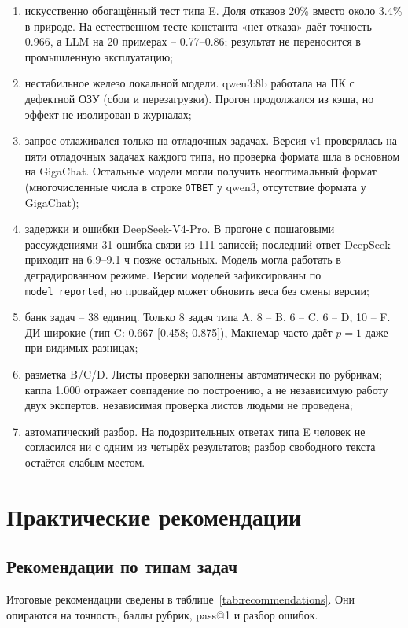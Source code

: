 \documentclass{bmstu}
\begin{document}
\begin{enumerate}[label=\arabic*), leftmargin=1.425\parindent, itemsep=0pt, topsep=-\parskip, wide=1.2cm]
\item искусственно обогащённый тест типа E. Доля отказов 20\% вместо около 3.4\% в природе. На естественном тесте константа «нет отказа» даёт точность 0.966, а LLM на 20 примерах -- 0.77--0.86; результат не переносится в промышленную эксплуатацию;
\item нестабильное железо локальной модели. qwen3:8b работала на ПК с дефектной ОЗУ (сбои и перезагрузки). Прогон продолжался из кэша, но эффект не изолирован в журналах;
\item запрос отлаживался только на отладочных задачах. Версия v1 проверялась на пяти отладочных задачах каждого типа, но проверка формата шла в основном на GigaChat. Остальные модели могли получить неоптимальный формат (многочисленные числа в строке \texttt{ОТВЕТ} у qwen3, отсутствие формата у GigaChat);
\item задержки и ошибки DeepSeek-V4-Pro. В прогоне с пошаговыми рассуждениями 31 ошибка связи из 111 записей; последний ответ DeepSeek приходит на 6.9--9.1 ч позже остальных. Модель могла работать в деградированном режиме. Версии моделей зафиксированы по \texttt{model\_reported}, но провайдер может обновить веса без смены версии;
\item банк задач -- 38 единиц. Только 8 задач типа A, 8 -- B, 6 -- C, 6 -- D, 10 -- F. ДИ широкие (тип C: 0.667 [0.458; 0.875]), Макнемар часто даёт $p=1$ даже при видимых разницах;
\item разметка B/C/D. Листы проверки заполнены автоматически по рубрикам; каппа 1.000 отражает совпадение по построению, а не независимую работу двух экспертов. независимая проверка листов людьми не проведена;
\item автоматический разбор. На подозрительных ответах типа E человек не согласился ни с одним из четырёх результатов; разбор свободного текста остаётся слабым местом.
\end{enumerate}

\chapter{Практические рекомендации}
\label{ch:recommendations}

\section{Рекомендации по типам задач}
Итоговые рекомендации сведены в таблице~\ref{tab:recommendations}. Они опираются на точность, баллы рубрик, pass@1 и разбор ошибок.
\end{document}
